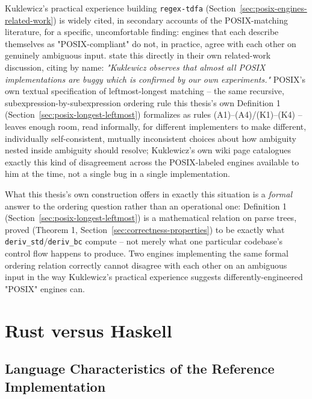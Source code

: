 Kuklewicz's practical experience building \texttt{regex-tdfa}
(Section~\ref{sec:posix-engines-related-work}) is widely cited, in
secondary accounts of the POSIX-matching literature, for a specific,
uncomfortable finding: engines that each describe themselves as
"POSIX-compliant" do not, in practice, agree with each other on
genuinely ambiguous input. \citet{sulzmannlu2014} state this directly in
their own related-work discussion, citing \citet{kuklewicz_regex_posix}
by name: \emph{"Kuklewicz observes that almost all POSIX implementations
are buggy which is confirmed by our own experiments."} POSIX's own
textual specification of leftmost-longest matching -- the same
recursive, subexpression-by-subexpression ordering rule this thesis's
own Definition 1 (Section~\ref{sec:posix-longest-leftmost}) formalizes
as rules (A1)--(A4)/(K1)--(K4) -- leaves enough room, read informally,
for different implementers to make different, individually
self-consistent, mutually inconsistent choices about how ambiguity
nested inside ambiguity should resolve; Kuklewicz's own wiki page
catalogues exactly this kind of disagreement across the POSIX-labeled
engines available to him at the time, not a single bug in a single
implementation.

What this thesis's own construction offers in exactly this situation is
a \emph{formal} answer to the ordering question rather than an
operational one: Definition 1 (Section~\ref{sec:posix-longest-leftmost}) is a
mathematical relation on parse trees, proved (Theorem 1,
Section~\ref{sec:correctness-properties}) to be exactly what
\texttt{deriv\_std}/\texttt{deriv\_bc} compute -- not merely what one
particular codebase's control flow happens to produce. Two engines
implementing the same formal ordering relation correctly cannot disagree
with each other on an ambiguous input in the way Kuklewicz's practical
experience suggests differently-engineered "POSIX" engines can.



\section{Rust versus Haskell}
\label{sec:rust-vs-haskell}

\subsection{Language Characteristics of the Reference Implementation}
\label{sec:haskell-language-characteristics}

